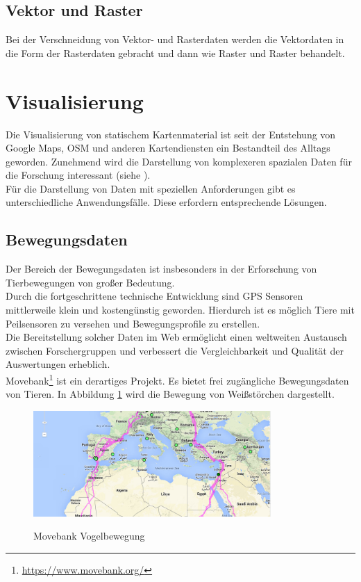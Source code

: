 \documentclass[10pt,conference,compsocconf]{IEEEtran}
\begin{document}
\subsection{Vektor und Raster}
Bei der Verschneidung von Vektor- und Rasterdaten werden die Vektordaten in die Form der Rasterdaten gebracht und dann wie Raster und Raster behandelt.


\section{Visualisierung}
Die Visualisierung von statischem Kartenmaterial ist seit der Entstehung von Google Maps, OSM und anderen Kartendiensten ein Bestandteil des Alltags geworden. Zunehmend wird die Darstellung von komplexeren spazialen Daten für die Forschung interessant (siehe \cite{gps_collars} \cite{wms_flow_mapping}).\\
Für die Darstellung von Daten mit speziellen Anforderungen gibt es unterschiedliche Anwendungsfälle. Diese erfordern entsprechende Lösungen.

\subsection{Bewegungsdaten}
Der Bereich der Bewegungsdaten ist insbesonders in der Erforschung von Tierbewegungen von großer Bedeutung\cite{gps_collars}.\\
Durch die fortgeschrittene technische Entwicklung sind GPS Sensoren mittlerweile klein und kostengünstig geworden. Hierdurch ist es möglich Tiere mit Peilsensoren zu versehen und Bewegungsprofile zu erstellen.\\
Die Bereitstellung solcher Daten im Web ermöglicht einen weltweiten Austausch zwischen Forschergruppen und verbessert die Vergleichbarkeit und Qualität der Auswertungen erheblich.\\
Movebank\footnote{\url{https://www.movebank.org/}} ist ein derartiges Projekt. Es bietet frei zugängliche Bewegungsdaten von Tieren. In Abbildung \ref{img:movebank} wird die Bewegung von Weißstörchen dargestellt.

\begin{figure}[H]
  \centering
  	\includegraphics[height=114pt]{img/movebank}\\
  \caption[]{Movebank Vogelbewegung}
  \label{img:movebank}
\end{figure}
\end{document}
